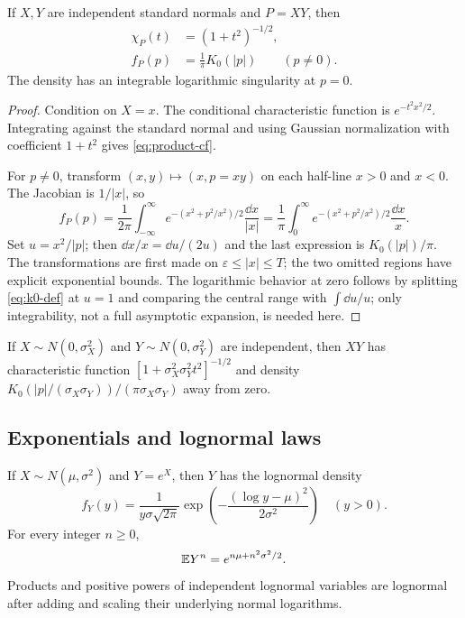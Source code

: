 \begin{theorem}\label{thm:product-normal}
If $X,Y$ are independent standard normals and $P=XY$, then
\begin{align}
 \chi_P(t)&=(1+t^2)^{-1/2},\label{eq:product-cf}\\
 f_P(p)&=\frac1\pi K_0(|p|)\qquad(p\ne0).\label{eq:product-density}
\end{align}
The density has an integrable logarithmic singularity at $p=0$.
\end{theorem}

\begin{proof}
Condition on $X=x$.  The conditional characteristic function is
$e^{-t^2x^2/2}$.  Integrating against the standard normal and using Gaussian normalization with coefficient $1+t^2$ gives \eqref{eq:product-cf}.

For $p\ne0$, transform $(x,y)\mapsto(x,p=xy)$ on each half-line $x>0$ and $x<0$.  The Jacobian is $1/|x|$, so
\[
 f_P(p)=\frac1{2\pi}\int_{-\infty}^{\infty}
 e^{-(x^2+p^2/x^2)/2}\frac{\dd x}{|x|}
 =\frac1\pi\int_0^\infty e^{-(x^2+p^2/x^2)/2}\frac{\dd x}{x}.
\]
Set $u=x^2/|p|$; then $\dd x/x=\dd u/(2u)$ and the last expression is $K_0(|p|)/\pi$.  The transformations are first made on $\varepsilon\le|x|\le T$; the two omitted regions have explicit exponential bounds.  The logarithmic behavior at zero follows by splitting \eqref{eq:k0-def} at $u=1$ and comparing the central range with $\int\dd u/u$; only integrability, not a full asymptotic expansion, is needed here.
\end{proof}

\begin{corollary}\label{cor:scaled-product}
If $X\sim N(0,\sigma_X^2)$ and $Y\sim N(0,\sigma_Y^2)$ are independent, then $XY$ has characteristic function
$[1+\sigma_X^2\sigma_Y^2t^2]^{-1/2}$ and density
$K_0(|p|/(\sigma_X\sigma_Y))/(\pi\sigma_X\sigma_Y)$ away from zero.
\end{corollary}

\subsection{Exponentials and lognormal laws}

\begin{theorem}\label{thm:lognormal}
If $X\sim N(\mu,\sigma^2)$ and $Y=e^X$, then $Y$ has the lognormal density
\begin{equation}\label{eq:lognormal-density}
 f_Y(y)=\frac{1}{y\sigma\sqrt{2\pi}}
 \exp\!\left(-\frac{(\log y-\mu)^2}{2\sigma^2}
\right)
 \quad(y>0).
\end{equation}
For every integer $n\ge0$,
\begin{equation}\label{eq:lognormal-moments}
 \mathbb E Y^n=e^{n\mu+n^2\sigma^2/2}.
\end{equation}
Products and positive powers of independent lognormal variables are lognormal after adding and scaling their underlying normal logarithms.
\end{theorem}

